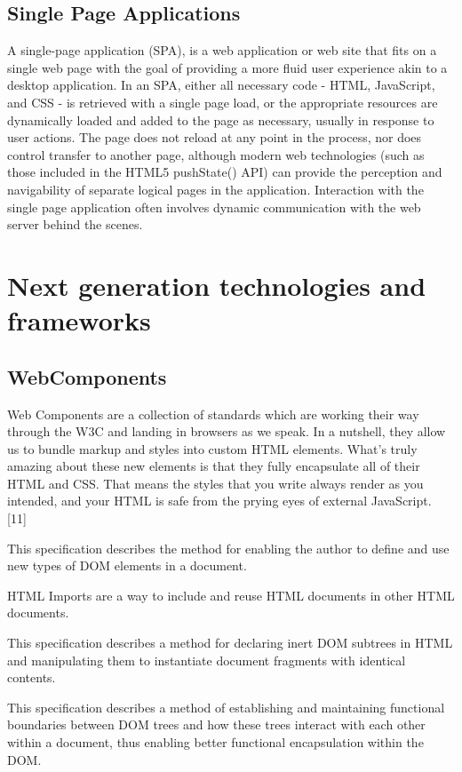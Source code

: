 \documentclass{sig-alternate}
\begin{document}
\subsection{Single Page Applications}

A single-page application (SPA), is a web application or web site that fits on a single web page with the goal of providing a more fluid user experience akin to a desktop application. In an SPA, either all necessary code - HTML, JavaScript, and CSS - is retrieved with a single page load, or the appropriate resources are dynamically loaded and added to the page as necessary, usually in response to user actions. The page does not reload at any point in the process, nor does control transfer to another page, although modern web technologies (such as those included in the HTML5 pushState() API) can provide the perception and navigability of separate logical pages in the application. Interaction with the single page application often involves dynamic communication with the web server behind the scenes.

\section{Next generation technologies and frameworks}

\subsection{WebComponents}

Web Components are a collection of standards which are working their way through the W3C and landing in browsers as we speak. In a nutshell, they allow us to bundle markup and styles into custom HTML elements. What's truly amazing about these new elements is that they fully encapsulate all of their HTML and CSS. That means the styles that you write always render as you intended, and your HTML is safe from the prying eyes of external JavaScript. [11]

\begin{description}
\itemsep1pt\parskip0pt
  \item[Custom Elements] This specification describes the method for enabling the author to define and use new types of DOM elements in a document.
  \item[HTML Imports] HTML Imports are a way to include and reuse HTML documents in other HTML documents.
  \item[Templates] This specification describes a method for declaring inert DOM subtrees in HTML and manipulating them to instantiate document fragments with identical contents.
  \item[Shadow DOM] This specification describes a method of establishing and maintaining functional boundaries between DOM trees and how these trees interact with each other within a document, thus enabling better functional encapsulation within the DOM.
\end{description}
\end{document}

